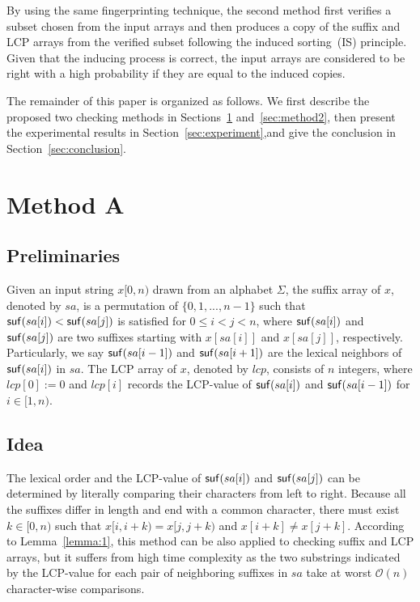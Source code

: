 \documentclass[10pt,journal,compsoc]{IEEEtran}
\begin{document}
By using the same fingerprinting technique, the second method first verifies a subset chosen from the input arrays and then produces a copy of the suffix and LCP arrays from the verified subset following the induced sorting~(IS) principle. Given that the inducing process is correct, the input arrays are considered to be right with a high probability if they are equal to the induced copies.

The remainder of this paper is organized as follows. We first describe the proposed two checking methods in Sections~\ref{sec:method1} and~\ref{sec:method2}, then present the experimental results in Section~\ref{sec:experiment},and give the conclusion in Section~\ref{sec:conclusion}.


\section{Method A} \label{sec:method1}


\subsection{Preliminaries} \label{sec:method1:notations}

Given an input string $x[0, n)$ drawn from an alphabet $\Sigma$, the suffix array of $x$, denoted by $sa$, is a permutation of $\{0, 1, ..., n - 1\}$ such that ${\sf suf}(sa[i]) < {\sf suf}(sa[j])$ is satisfied for $0 \le i < j < n$, where ${\sf suf}(sa[i])$ and ${\sf suf}(sa[j])$ are two suffixes starting with $x[sa[i]]$ and $x[sa[j]]$, respectively. Particularly, we say ${\sf suf}(sa[i - 1])$ and  ${\sf suf}(sa[i + 1])$ are the lexical neighbors of ${\sf suf}(sa[i])$ in $sa$. The LCP array of $x$, denoted by $lcp$, consists of $n$ integers, where $lcp[0]:=0$ and $lcp[i]$ records the LCP-value of ${\sf suf}(sa[i])$ and ${\sf suf}(sa[i - 1])$ for $i \in [1, n)$.


\subsection{Idea} \label{sec:method1:idea}

The lexical order and the LCP-value of ${\sf suf}(sa[i])$ and ${\sf suf}(sa[j])$ can be determined by literally comparing their characters from left to right. Because all the suffixes differ in length and end with a common character, there must exist $k \in [0, n)$ such that $x[i, i + k) = x[j, j + k)$ and $x[i + k] \ne x[j + k]$. According to Lemma~\ref{lemma:1}, this method can be also applied to checking suffix and LCP arrays, but it suffers from high time complexity as the two substrings indicated by the LCP-value for each pair of neighboring suffixes in $sa$ take at worst $\mathcal{O}(n)$ character-wise comparisons.
\end{document}
